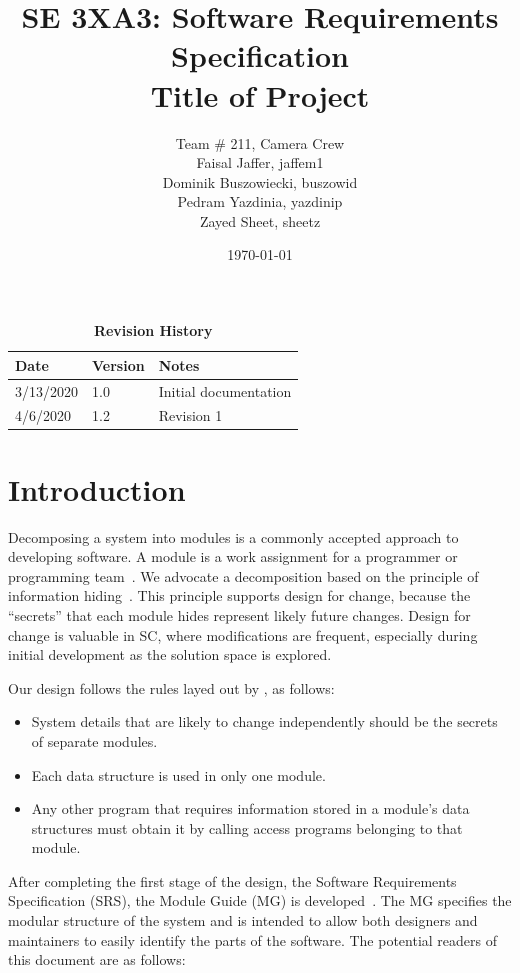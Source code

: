 \documentclass[12pt, titlepage]{article}
\title{SE 3XA3: Software Requirements Specification\\Title of Project}
\author{Team \# 211, Camera Crew
		\\ Faisal Jaffer, jaffem1
		\\ Dominik Buszowiecki, buszowid
		\\ Pedram Yazdinia, yazdinip
		\\ Zayed Sheet, sheetz
}
\date{\today}
\begin{document}
\maketitle

\tableofcontents
\listoftables
\listoffigures

\newpage

\begin{table}[h]
\caption{\bf Revision History}
\begin{tabularx}{\textwidth}{p{3cm}p{2cm}X}
\toprule {\bf Date} & {\bf Version} & {\bf Notes}\\
\midrule
3/13/2020 & 1.0 & Initial documentation\\
4/6/2020 & 1.2 & Revision 1\\
\bottomrule
\end{tabularx}
\end{table}

\newpage



\section{Introduction}

Decomposing a system into modules is a commonly accepted approach to developing
software.  A module is a work assignment for a programmer or programming
team~\citep{ParnasEtAl1984}.  We advocate a decomposition
based on the principle of information hiding~\citep{Parnas1972a}.  This
principle supports design for change, because the ``secrets'' that each module
hides represent likely future changes.  Design for change is valuable in SC,
where modifications are frequent, especially during initial development as the
solution space is explored.  

Our design follows the rules layed out by \citet{ParnasEtAl1984}, as follows:
\begin{itemize}
\item System details that are likely to change independently should be the
  secrets of separate modules.
\item Each data structure is used in only one module.
\item Any other program that requires information stored in a module's data
  structures must obtain it by calling access programs belonging to that module.
\end{itemize}

After completing the first stage of the design, the Software Requirements
Specification (SRS), the Module Guide (MG) is developed~\citep{ParnasEtAl1984}. The MG
specifies the modular structure of the system and is intended to allow both
designers and maintainers to easily identify the parts of the software.  The
potential readers of this document are as follows:
\end{document}
